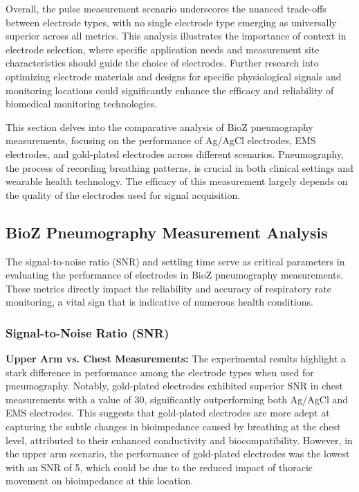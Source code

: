\documentclass[conference]{IEEEtran}
\begin{document}
Overall, the pulse measurement scenario underscores the nuanced trade-offs between electrode types, with no single electrode type emerging as universally superior across all metrics. This analysis illustrates the importance of context in electrode selection, where specific application needs and measurement site characteristics should guide the choice of electrodes. Further research into optimizing electrode materials and designs for specific physiological signals and monitoring locations could significantly enhance the efficacy and reliability of biomedical monitoring technologies.

This section delves into the comparative analysis of BioZ pneumography measurements, focusing on the performance of Ag/AgCl electrodes, EMS electrodes, and gold-plated electrodes across different scenarios. Pneumography, the process of recording breathing patterns, is crucial in both clinical settings and wearable health technology. The efficacy of this measurement largely depends on the quality of the electrodes used for signal acquisition.

\subsection{BioZ Pneumography Measurement Analysis}

The signal-to-noise ratio (SNR) and settling time serve as critical parameters in evaluating the performance of electrodes in BioZ pneumography measurements. These metrics directly impact the reliability and accuracy of respiratory rate monitoring, a vital sign that is indicative of numerous health conditions.

\subsubsection{Signal-to-Noise Ratio (SNR)}

\textbf{Upper Arm vs. Chest Measurements:} The experimental results highlight a stark difference in performance among the electrode types when used for pneumography. Notably, gold-plated electrodes exhibited superior SNR in chest measurements with a value of 30, significantly outperforming both Ag/AgCl and EMS electrodes. This suggests that gold-plated electrodes are more adept at capturing the subtle changes in bioimpedance caused by breathing at the chest level, attributed to their enhanced conductivity and biocompatibility. However, in the upper arm scenario, the performance of gold-plated electrodes was the lowest with an SNR of 5, which could be due to the reduced impact of thoracic movement on bioimpedance at this location.
\end{document}
